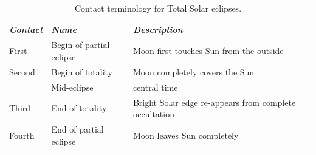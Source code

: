 \begin{table}[p]
  \centering\small
  \begin{tabular}{lll}
\toprule
\emph{Contact} & \emph{Name}       & \emph{Description}\\\midrule
First   & Begin of partial eclipse & Moon first touches Sun from the outside\\  
Second  & Begin of totality        & Moon completely covers the Sun \\  
        & Mid-eclipse & central time\\
Third   & End of totality          & Bright Solar edge re-appears from complete occultation\\  
Fourth  & End of partial eclipse   & Moon leaves Sun completely \\  
\bottomrule
\end{tabular}
\caption{Contact terminology for Total Solar eclipses.}
\label{tab:Eclipses:ContactTimesSolar}
\end{table}

